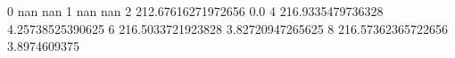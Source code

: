 0 nan nan
1 nan nan
2 212.67616271972656 0.0
4 216.9335479736328 4.25738525390625
6 216.5033721923828 3.82720947265625
8 216.57362365722656 3.8974609375
